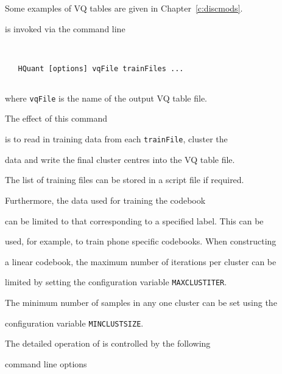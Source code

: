 Some examples of VQ tables are given in Chapter~\ref{c:discmods}.










 is invoked via the command line





\begin{verbatim}


   HQuant [options] vqFile trainFiles ...


\end{verbatim}


where \texttt{vqFile} is the name of the output VQ table file.


The effect of this command


is to read in training data from each \texttt{trainFile}, cluster the


data and write the final cluster centres into the VQ table file.





The list of training files can be stored in a script file if required.


Furthermore, the data used for training the codebook


can be limited to that corresponding to a specified label.  This can be


used, for example, to train phone specific codebooks.  When constructing


a linear codebook, the maximum number of iterations per cluster can be


limited by setting the configuration variable \texttt{MAXCLUSTITER}.


The minimum number of samples in any one cluster can be set using the


 configuration variable \texttt{MINCLUSTSIZE}.





The detailed operation of  is controlled by the following


command line options


